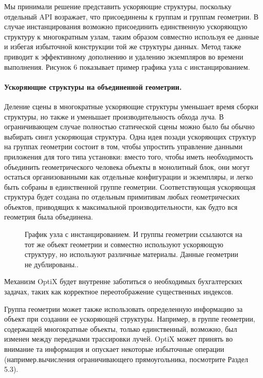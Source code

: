   Мы принимали решение представить ускоряющие структуры, поскольку отдельный API возражает, что присоединены к группам и группам геометрии. В случае инстанцирования возможно присоединить единственную ускоряющую структуру к многократным узлам, таким образом совместно используя ее данные и избегая избыточной конструкции той же структуры данных. Метод также приводит к эффективному дополнению и удалению экземпляров во времени выполнения. Рисунок 6 показывает пример графика узла с инстанцированием.
\paragraph{Ускоряющие структуры на объединенной геометрии.} Деление сцены в многократные ускоряющие структуры уменьшает время сборки структуры, но также и уменьшает производительность обхода луча. В ограничивающем случае полностью статической сцены можно было бы обычно выбирать сингл ускоряющая структура. Одна идея позади ускоряющих структур на группах геометрии состоит в том, чтобы упростить управление данными приложения для того типа установки: вместо того, чтобы иметь необходимость объединить геометрического человека объекты в монолитный блок, они могут остаться организованными как отдельные конфигурации и экземпляры, и легко быть собраны в единственной группе геометрии. Соответствующая ускоряющая структура будет создана по отдельным примитивам любых геометрических объектов, приводящих к максимальной производительности, как будто вся геометрия была объединена.

\begin{figure}[h!]
\caption{График узла с инстанцированием. И группы геометрии ссылаются на тот же объект геометрии и совместно используют ускоряющую структуру, но используют различные материалы. Данные геометрии не дублированы..}
\label{fig3}
\end{figure}
Механизм OptiX будет внутренне заботиться о необходимых бухгалтерских задачах, таких как корректное переотображение существенных индексов.

  Группа геометрии может также использовать определенную информацию за объект при создании ее ускоряющей структуры. Например, в группе геометрии, содержащей многократные объекты, только единственный, возможно, был изменен между передачами трассировки лучей. OptiX может принять во внимание та информация и опускает некоторые избыточные операции (например.вычисления ограничивающего прямоугольника, посмотрите Раздел 5.3).
